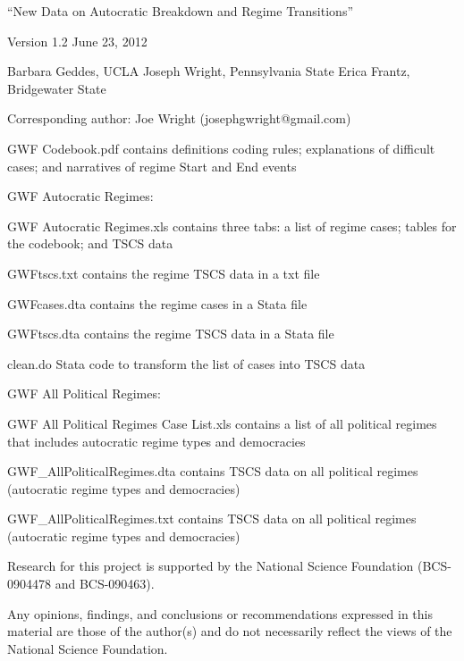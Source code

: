 ``New Data on Autocratic Breakdown and Regime Transitions''

Version 1.2 June 23, 2012

Barbara Geddes, UCLA 
Joseph Wright, Pennsylvania State
Erica Frantz, Bridgewater State

Corresponding author: Joe Wright (josephgwright@gmail.com)

GWF Codebook.pdf		contains definitions coding rules; explanations of difficult cases; and narratives of regime Start and End events



GWF Autocratic Regimes:

	GWF Autocratic Regimes.xls 	contains three tabs: a list of regime cases; tables for the codebook; and TSCS data

	GWFtscs.txt					contains the regime TSCS data in a txt file

	GWFcases.dta				contains the regime cases in a Stata file

	GWFtscs.dta					contains the regime TSCS data in a Stata file

	clean.do						Stata code to transform the list of cases into TSCS data

GWF All Political Regimes: 

	GWF All Political Regimes Case List.xls		contains a list of all political regimes that includes autocratic regime types and democracies
	
	GWF_AllPoliticalRegimes.dta				contains TSCS data on all political regimes (autocratic regime types and democracies)
	
	GWF_AllPoliticalRegimes.txt				contains TSCS data on all political regimes (autocratic regime types and democracies)


Research for this project is supported by the National Science Foundation (BCS-0904478 and BCS-090463).  

Any opinions, findings, and conclusions or recommendations expressed in this material are those of the author(s) 
and do not necessarily reflect the views of the National Science Foundation.


